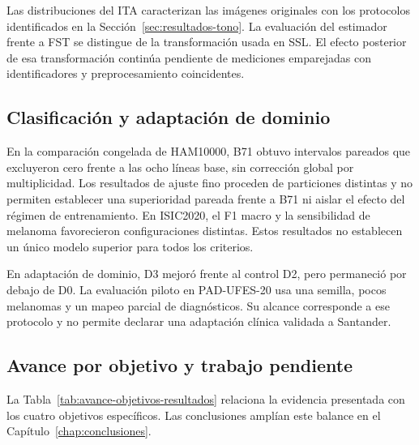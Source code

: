 Las distribuciones del ITA caracterizan las imágenes originales con los protocolos identificados en la Sección~\ref{sec:resultados-tono}. La evaluación del estimador frente a FST se distingue de la transformación usada en SSL. El efecto posterior de esa transformación continúa pendiente de mediciones emparejadas con identificadores y preprocesamiento coincidentes.

\subsection{Clasificación y adaptación de dominio}

En la comparación congelada de HAM10000, B71 obtuvo intervalos pareados que excluyeron cero frente a las ocho líneas base, sin corrección global por multiplicidad. Los resultados de ajuste fino proceden de particiones distintas y no permiten establecer una superioridad pareada frente a B71 ni aislar el efecto del régimen de entrenamiento. En ISIC2020, el F1 macro y la sensibilidad de melanoma favorecieron configuraciones distintas. Estos resultados no establecen un único modelo superior para todos los criterios.

En adaptación de dominio, D3 mejoró frente al control D2, pero permaneció por debajo de D0. La evaluación piloto en PAD-UFES-20 usa una semilla, pocos melanomas y un mapeo parcial de diagnósticos. Su alcance corresponde a ese protocolo y no permite declarar una adaptación clínica validada a Santander.

\subsection{Avance por objetivo y trabajo pendiente}

La Tabla~\ref{tab:avance-objetivos-resultados} relaciona la evidencia presentada con los cuatro objetivos específicos. Las conclusiones amplían este balance en el Capítulo~\ref{chap:conclusiones}.

